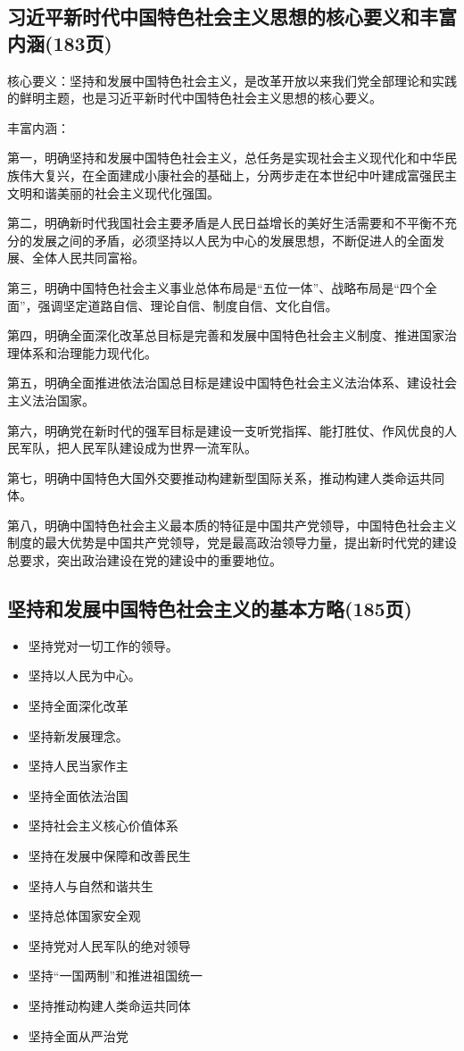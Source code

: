 \documentclass[cn,11pt]{elegantbook}
\begin{document}
\subsection{习近平新时代中国特色社会主义思想的核心要义和丰富内涵(183页)}
{\large 
{\heiti 核心要义：}坚持和发展中国特色社会主义，是改革开放以来我们党全部理论和实践的鲜明主题，也是习近平新时代中国特色社会主义思想的核心要义。

{\heiti 丰富内涵：}

第一，明确坚持和发展中国特色社会主义，总任务是实现社会主义现代化和中华民族伟大复兴，在全面建成小康社会的基础上，分两步走在本世纪中叶建成富强民主文明和谐美丽的社会主义现代化强国。

第二，明确新时代我国社会主要矛盾是人民日益增长的美好生活需要和不平衡不充分的发展之间的矛盾，必须坚持以人民为中心的发展思想，不断促进人的全面发展、全体人民共同富裕。

第三，明确中国特色社会主义事业总体布局是“五位一体”、战略布局是“四个全面”，强调坚定道路自信、理论自信、制度自信、文化自信。

第四，明确全面深化改革总目标是完善和发展中国特色社会主义制度、推进国家治理体系和治理能力现代化。

第五，明确全面推进依法治国总目标是建设中国特色社会主义法治体系、建设社会主义法治国家。

第六，明确党在新时代的强军目标是建设一支听党指挥、能打胜仗、作风优良的人民军队，把人民军队建设成为世界一流军队。

第七，明确中国特色大国外交要推动构建新型国际关系，推动构建人类命运共同体。

第八，明确中国特色社会主义最本质的特征是中国共产党领导，中国特色社会主义制度的最大优势是中国共产党领导，党是最高政治领导力量，提出新时代党的建设总要求，突出政治建设在党的建设中的重要地位。
}
\subsection{坚持和发展中国特色社会主义的基本方略(185页)}
\begin{itemize}
	\item 坚持党对一切工作的领导。
	\item 坚持以人民为中心。
	\item 坚持全面深化改革
	\item 坚持新发展理念。
	\item 坚持人民当家作主
	\item 坚持全面依法治国
	\item 坚持社会主义核心价值体系
	\item 坚持在发展中保障和改善民生
	\item 坚持人与自然和谐共生
	\item 坚持总体国家安全观
	\item 坚持党对人民军队的绝对领导
	\item 坚持“一国两制”和推进祖国统一
	\item 坚持推动构建人类命运共同体
	\item 坚持全面从严治党
\end{itemize}
{\large }
\end{document}
